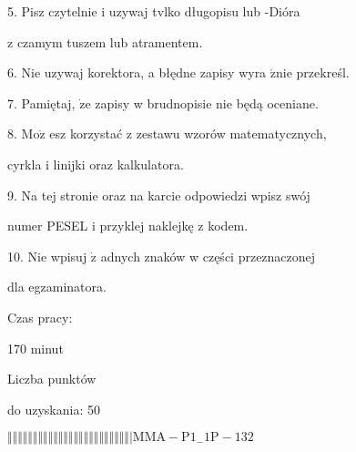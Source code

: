 \documentclass[a4paper,12pt]{article}
\begin{document}
5. Pisz czytelnie i uzywaj tvlko długopisu lub -Dióra

z czamym tuszem lub atramentem.

6. Nie uzywaj korektora, a błędne zapisy wyra $\acute{\mathrm{z}}\mathrm{n}\mathrm{i}\mathrm{e}$ przekreśl.

7. Pamiętaj, $\dot{\mathrm{z}}\mathrm{e}$ zapisy w brudnopisie nie będą oceniane.

8. $\mathrm{M}\mathrm{o}\dot{\mathrm{z}}$ esz korzystać z zestawu wzorów matematycznych,

cyrkla i linijki oraz kalkulatora.

9. Na tej stronie oraz na karcie odpowiedzi wpisz swój

numer PESEL i przyklej naklejkę z kodem.

10. Nie wpisuj $\dot{\mathrm{z}}$ adnych znaków w części przeznaczonej

dla egzaminatora.

Czas pracy:

170 minut

Liczba punktów

do uzyskania: 50

$\Vert\Vert\Vert\Vert\Vert\Vert\Vert\Vert\Vert\Vert\Vert\Vert\Vert\Vert\Vert\Vert\Vert\Vert\Vert\Vert\Vert\Vert\Vert\Vert|  \mathrm{M}\mathrm{M}\mathrm{A}-\mathrm{P}1_{-}1\mathrm{P}-132$
\end{document}
